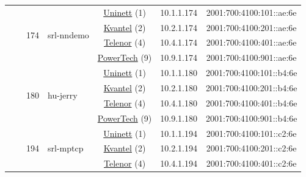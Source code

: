 \begin{small}
\begin{center}
\begin{longtable}{|c|c|c|c|c|c|c|c|}
  &  & \multirow{4}{*}{\tiny{174}} & \multicolumn{1}{|l|}{\multirow{4}{*}{\tiny{srl-nndemo}}} & \multicolumn{2}{|c|}{\tiny{\href{https://www.uninett.no}{Uninett} (1)}} & \tiny{10.1.1.174} & \tiny{2001:700:4100:101::ae:6e} \\* \cline{5-5}\cline{6-6}\cline{7-7}\cline{8-8}
  &  &  &  & \multicolumn{2}{|c|}{\tiny{\href{http://kvantel.no}{Kvantel} (2)}} & \tiny{10.2.1.174} & \tiny{2001:700:4100:201::ae:6e} \\* \cline{5-5}\cline{6-6}\cline{7-7}\cline{8-8}
  &  &  &  & \multicolumn{2}{|c|}{\tiny{\href{https://www.telenor.no}{Telenor} (4)}} & \tiny{10.4.1.174} & \tiny{2001:700:4100:401::ae:6e} \\* \cline{5-5}\cline{6-6}\cline{7-7}\cline{8-8}
  &  &  &  & \multicolumn{2}{|c|}{\tiny{\href{http://www.powertech.no}{PowerTech} (9)}} & \tiny{10.9.1.174} & \tiny{2001:700:4100:901::ae:6e} \\* \cline{3-3}\cline{4-4}\cline{5-5}\cline{6-6}\cline{7-7}\cline{8-8}
  &  & \multirow{4}{*}{\tiny{180}} & \multicolumn{1}{|l|}{\multirow{4}{*}{\tiny{hu-jerry}}} & \multicolumn{2}{|c|}{\tiny{\href{https://www.uninett.no}{Uninett} (1)}} & \tiny{10.1.1.180} & \tiny{2001:700:4100:101::b4:6e} \\* \cline{5-5}\cline{6-6}\cline{7-7}\cline{8-8}
  &  &  &  & \multicolumn{2}{|c|}{\tiny{\href{http://kvantel.no}{Kvantel} (2)}} & \tiny{10.2.1.180} & \tiny{2001:700:4100:201::b4:6e} \\* \cline{5-5}\cline{6-6}\cline{7-7}\cline{8-8}
  &  &  &  & \multicolumn{2}{|c|}{\tiny{\href{https://www.telenor.no}{Telenor} (4)}} & \tiny{10.4.1.180} & \tiny{2001:700:4100:401::b4:6e} \\* \cline{5-5}\cline{6-6}\cline{7-7}\cline{8-8}
  &  &  &  & \multicolumn{2}{|c|}{\tiny{\href{http://www.powertech.no}{PowerTech} (9)}} & \tiny{10.9.1.180} & \tiny{2001:700:4100:901::b4:6e} \\* \cline{3-3}\cline{4-4}\cline{5-5}\cline{6-6}\cline{7-7}\cline{8-8}
  &  & \multirow{4}{*}{\tiny{194}} & \multicolumn{1}{|l|}{\multirow{4}{*}{\tiny{srl-mptcp}}} & \multicolumn{2}{|c|}{\tiny{\href{https://www.uninett.no}{Uninett} (1)}} & \tiny{10.1.1.194} & \tiny{2001:700:4100:101::c2:6e} \\* \cline{5-5}\cline{6-6}\cline{7-7}\cline{8-8}
  &  &  &  & \multicolumn{2}{|c|}{\tiny{\href{http://kvantel.no}{Kvantel} (2)}} & \tiny{10.2.1.194} & \tiny{2001:700:4100:201::c2:6e} \\* \cline{5-5}\cline{6-6}\cline{7-7}\cline{8-8}
  &  &  &  & \multicolumn{2}{|c|}{\tiny{\href{https://www.telenor.no}{Telenor} (4)}} & \tiny{10.4.1.194} & \tiny{2001:700:4100:401::c2:6e} \\* \cline{5-5}\cline{6-6}\cline{7-7}\cline{8-8}

\end{longtable}
\end{center}
\end{small}
